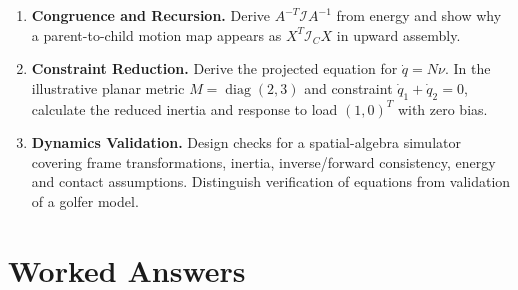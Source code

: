 \begin{enumerate}
\item \textbf{Congruence and Recursion.} Derive $A^{-T}\mathcal I A^{-1}$ from energy and show why a parent-to-child motion map appears as $X^T\mathcal I_C X$ in upward assembly.
\item \textbf{Constraint Reduction.} Derive the projected equation for $\dot q=N\nu$. In the illustrative planar metric $M=\operatorname{diag}(2,3)$ and constraint $\dot q_1+\dot q_2=0$, calculate the reduced inertia and response to load $(1,0)^T$ with zero bias.
\item \textbf{Dynamics Validation.} Design checks for a spatial-algebra simulator covering frame transformations, inertia, inverse/forward consistency, energy and contact assumptions. Distinguish verification of equations from validation of a golfer model.
\end{enumerate}

\section{Worked Answers}
\label{sec:spatial_answers}

